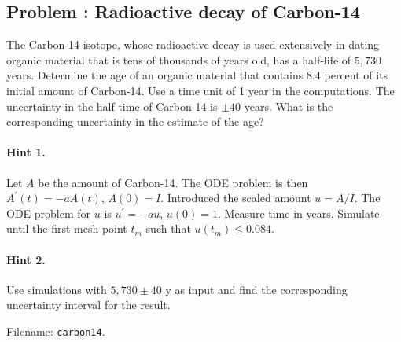 \documentclass[%
oneside,                 %
final,                   %
10pt]{article}
\newenvironment{doconceexercise}{}{}
\newcounter{doconceexercisecounter}
\begin{document}
\begin{doconceexercise}

\subsection*{Problem \thedoconceexercisecounter: Radioactive decay of Carbon-14}

\label{decay:app:exer:radio:C14}

The \href{{http://en.wikipedia.org/wiki/Carbon-14}}{Carbon-14} isotope,
whose radioactive decay is used extensively in dating organic material
that is tens of thousands of years old, has a half-life of $5,730$
years.  Determine the age of an organic material that contains 8.4 percent
of its initial amount of Carbon-14.  Use a time unit of 1 year in the
computations.  The uncertainty in the half time of Carbon-14 is $\pm
40$ years.  What is the corresponding uncertainty in the estimate of
the age?


\paragraph{Hint 1.}
Let $A$ be the amount of Carbon-14. The ODE problem is then
$A^{\prime}(t)=-aA(t)$, $A(0)=I$. Introduced the scaled amount
$u=A/I$. The ODE problem for $u$ is $u^{\prime}=-au$, $u(0)=1$.
Measure time in years.
Simulate until the first mesh point $t_m$ such that $u(t_m)\leq 0.084$.



\paragraph{Hint 2.}
Use simulations with $5,730\pm 40$ y as input
and find the corresponding uncertainty interval for the result.



\noindent Filename: \texttt{carbon14}.

\end{doconceexercise}
\end{document}

